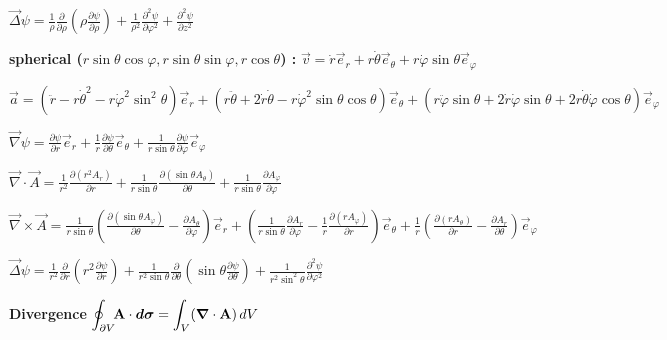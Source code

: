 \item $\vec{\Delta}\psi = \frac{1}{\rho}\frac{\partial}{\partial \rho}\left(\rho\frac{\partial\psi}{\partial \rho}\right) + \frac{1}{\rho^2}\frac{\partial^2\psi}{\partial\varphi^2} + \frac{\partial^2\psi}{\partial z^2}$

\item[] \textbf{spherical ($r\sin\theta\cos\varphi, r\sin\theta\sin\varphi, r \cos \theta$) : \:}
$\vec{v} = \dot{r}\vec{e}_r + r\dot{\theta}\vec{e}_\theta + r\dot{\varphi}\sin\theta\vec{e}_\varphi$

\item $\vec{a} = (\ddot{r} - r\dot{\theta}^2 - r\dot{\varphi}^2\sin^2\theta)\vec{e}_r + (r\ddot{\theta} + 2\dot{r}\dot{\theta} - r\dot{\varphi}^2\sin\theta\cos\theta)\vec{e}_\theta + (r\ddot{\varphi}\sin\theta + 2\dot{r}\dot{\varphi}\sin\theta + 2r\dot{\theta}\dot{\varphi}\cos\theta)\vec{e}_\varphi$

\item $\vec{\nabla}\psi=\frac{\partial \psi}{\partial r}\vec{e}_r+\frac{1}{r}\frac{\partial \psi}{\partial\theta}\vec{e}_{\theta}+\frac{1}{r\sin\theta}\frac{\partial \psi}{\partial \varphi}\vec{e}_\varphi$

\item $\vec{\nabla} \cdot \vec{A}=\frac{1}{r^2}\frac{\partial (r^2A_r)}{\partial r}+\frac{1}{r\sin\theta}\frac{\partial(\sin\theta A_{\theta})}{\partial\theta}+\frac{1}{r\sin\theta}\frac{\partial A_{\varphi}}{\partial\varphi}$

\item $\vec{\nabla} \times \vec{A} = \frac{1}{r \sin \theta} \left( \frac{\partial (\sin \theta A_{\varphi})}{\partial \theta} - \frac{\partial A_{\theta}}{\partial \varphi} \right) \vec{e}_r + \left( \frac{1}{r \sin \theta} \frac{\partial A_r}{\partial \varphi} - \frac{1}{r} \frac{\partial (r A_{\varphi})}{\partial r} \right) \vec{e}_{\theta} + \frac{1}{r} \left( \frac{\partial (r A_{\theta})}{\partial r} - \frac{\partial A_r}{\partial \theta} \right) \vec{e}_{\varphi}$

\item $\vec{\Delta}\psi = \frac{1}{r^2}\frac{\partial}{\partial r}\left(r^2\frac{\partial\psi}{\partial r}\right) + \frac{1}{r^2\sin\theta}\frac{\partial}{\partial\theta}\left(\sin\theta\frac{\partial\psi}{\partial\theta}\right) + \frac{1}{r^2\sin^2\theta}\frac{\partial^2\psi}{\partial\varphi^2}$

\squishend
{}
\squishlist
\item \textbf{Divergence} \quad$\displaystyle{\oint_{\partial V}} \! \vec{\rm{A}} \cdot \vec{d\sigma} = \displaystyle{\int_V} (\vec{\nabla} \cdot \vec{\rm{A}}) \, dV$

